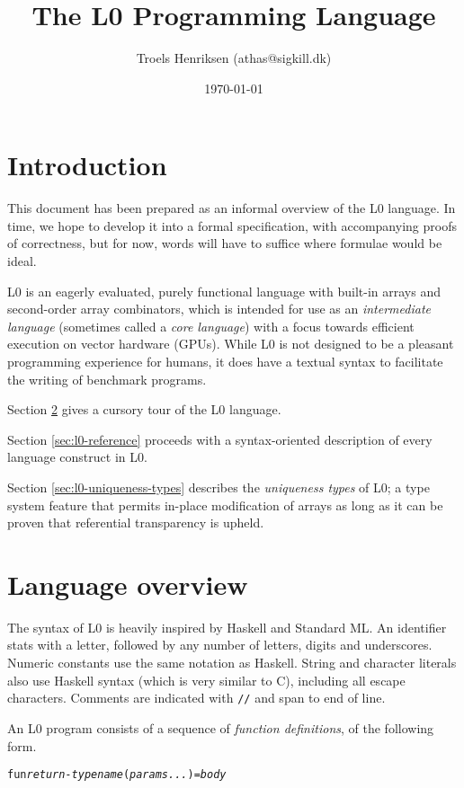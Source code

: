\documentclass[oneside]{memoir}
\title{The L0 Programming Language}
\date{\today}
\author{Troels Henriksen (athas@sigkill.dk)}
\begin{document}
\maketitle

\section{Introduction}

This document has been prepared as an informal overview of the L0
language.  In time, we hope to develop it into a formal specification,
with accompanying proofs of correctness, but for now, words will have
to suffice where formulae would be ideal.

L0 is an eagerly evaluated, purely functional language with built-in
arrays and second-order array combinators, which is intended for use
as an \emph{intermediate language} (sometimes called a \emph{core
  language}) with a focus towards efficient execution on vector
hardware (GPUs).  While L0 is not designed to be a pleasant
programming experience for humans, it does have a textual syntax to
facilitate the writing of benchmark programs.

Section \ref{sec:l0-overview} gives a cursory tour of the L0 language.

Section \ref{sec:l0-reference} proceeds with a syntax-oriented
description of every language construct in L0.

Section \ref{sec:l0-uniqueness-types} describes the \emph{uniqueness
  types} of L0; a type system feature that permits in-place
modification of arrays as long as it can be proven that referential
transparency is upheld.

\section{Language overview}
\label{sec:l0-overview}

The syntax of L0 is heavily inspired by Haskell and Standard ML.  An
identifier stats with a letter, followed by any number of letters,
digits and underscores.  Numeric constants use the same notation as
Haskell.  String and character literals also use Haskell syntax (which
is very similar to C), including all escape characters.  Comments are
indicated with \texttt{//} and span to end of line.

An L0 program consists of a sequence of \emph{function definitions},
of the following form.

\begin{alltt}
  fun \textit{return-type} \textit{name}(\textit{params...}) = \textit{body}
\end{alltt}
\end{document}
